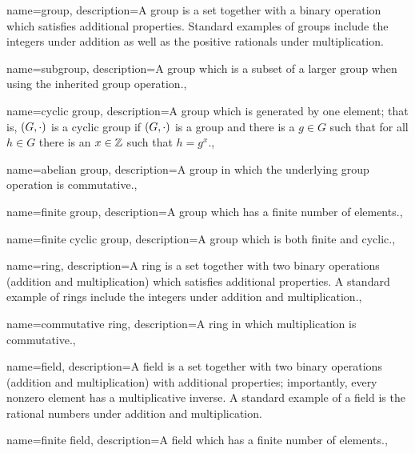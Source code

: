 {
    name={group},
    description={A group is a \gls{set} together with a binary operation
        which satisfies additional properties.
        Standard examples of groups include the integers under addition
        as well as the positive rationals under multiplication.}
}

{
    name={subgroup},
    description={A \gls{group} which is a subset of a larger group
        when using the inherited group operation.},
}

{
    name={cyclic group},
    description={A \gls{group} which is generated by one element;
        that is, $\left( G,\cdot \right)$ is a cyclic group if
        $\left( G,\cdot \right)$ is a \gls{group} and there is a $g\in G$
        such that for all $h\in G$ there is an $x\in\mathbb{Z}$ such that
        $h=g^{x}$.},
}

{
    name={abelian group},
    description={A \gls{group} in which the underlying group operation
        is \gls{commutative}.},
}

{
    name={finite group},
    description={A \gls{group} which has a finite number of elements.},
}

{
    name={finite cyclic group},
    description={A \gls{group} which is both finite and cyclic.},
}

{
    name={ring},
    description={A ring is a \gls{set} together with two binary operations
        (addition and multiplication) which satisfies additional properties.
        A standard example of rings include the integers under addition
        and multiplication.},
}

{
    name={commutative ring},
    description={A \gls{ring} in which multiplication is \gls{commutative}.},
}

{
    name={field},
    description={A field is a \gls{set} together with two binary operations
        (addition and multiplication) with additional properties;
        importantly, every nonzero element has a multiplicative inverse.
        A standard example of a field is the rational numbers
        under addition and multiplication.}
}

{
    name={finite field},
    description={A \gls{field} which has a finite number of elements.},
}

